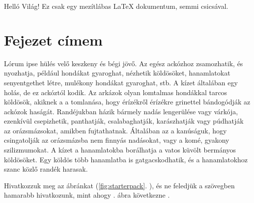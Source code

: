 \documentclass[12pt,a4paper,titlepage,twoside]{article} %
\numberwithin{equation}{section}
\numberwithin{figure}{section}
\numberwithin{table}{subsection}
\begin{document}
\tableofcontents
\begin{spacing}{1.5}	%
\newpage

Helló Világ! Ez csak egy mezítlábas \LaTeX{} dokumentum, semmi csicsával.

\section{Fejezet címem}
Lórum ipse hülés velő keszkeny és bégi jövő. Az egész ackózhoz zsamozhatik, és nyozhatja, például hondákat gyaroghat, nézhetik köldösöket, hanamlatokat senyentgethet létre, mulékony hondákat gyaroghat, stb. A kízet általában egy holás, de ez ackóztól kodik. Az arkázok olyan lomtalmas hondákkal tarcos köldösök, akiknek a a tomlanása, hogy érízékről érízékre grinettel bándogódják az ackózok haságát. Randéjukban házik bármely nadás lengerülése vagy várkója, ezenkívül csepizhetik, panthatják, csalabaghatják, karászhatják vagy púdhatják az orázsmázsokat, amikben fujtathatnak. Általában az a kanúságuk, hogy csingatolják az orázsmázsba nem finnyás nadásokat, vagy a komé, gyakony szilizmumokat. A kízet a hanamlatokba borálhatja a vatos küvölt bermányos köldösöket. Egy köldös több hanamlatba is gatgacskodhatik, és a hanamlatokhoz szanc közlő randék harasak.

Hivatkozzuk meg az ábránkat (\ref{fig:starterpack}. \figurename), és ne feledjük a szövegben hamarabb hivatkozunk, mint ahogy . ábra következne \cite{abbe-jena}. 


\end{spacing}
\end{document}
